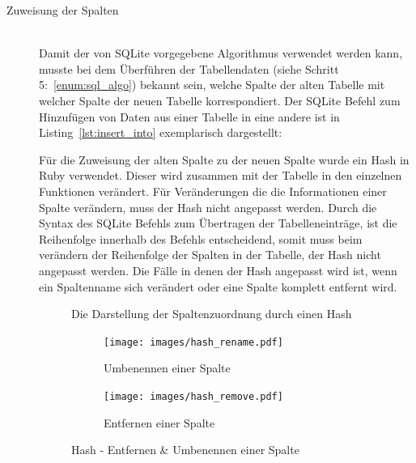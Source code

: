 \begin{description}
\item[Zuweisung der Spalten] \hfill\\
Damit der von SQLite vorgegebene Algorithmus verwendet werden kann, musste bei dem Überführen der Tabellendaten (siehe Schritt 5:~\ref{enum:sql_algo}) bekannt sein, welche Spalte der alten Tabelle mit welcher Spalte der neuen Tabelle korrespondiert.  
Der SQLite Befehl zum Hinzufügen von Daten aus einer Tabelle in eine andere ist in Listing~\ref{lst:insert_into} exemplarisch dargestellt:


Für die Zuweisung der alten Spalte zu der neuen Spalte wurde ein Hash in Ruby verwendet. Dieser wird zusammen mit der Tabelle in den einzelnen Funktionen verändert. Für Veränderungen die die Informationen einer Spalte verändern, muss der Hash nicht angepasst werden. Durch die Syntax des SQLite Befehls zum Übertragen der Tabelleneinträge, ist die Reihenfolge innerhalb des Befehls entscheidend, somit muss beim verändern der Reihenfolge der Spalten in der Tabelle, der Hash nicht angepasst werden. Die Fälle in denen der Hash angepasst wird ist, wenn ein Spaltenname sich verändert oder eine Spalte komplett entfernt wird.

\begin{figure}[ht]
        \centering
        \caption{Die Darstellung der Spaltenzuordnung durch einen Hash}
        \label{pic:hash_new}
\end{figure}

\begin{figure}[ht]
  \begin{subfigure}[b]{0.45\textwidth}
    \texttt{[image: images/hash\_rename.pdf]}
    \caption{Umbenennen einer Spalte}
    \label{fig:hash_rename}
  \end{subfigure}\hfill
  \begin{subfigure}[b]{0.45\textwidth}
    \texttt{[image: images/hash\_remove.pdf]}
    \caption{Entfernen einer Spalte}
    \label{fig:hash_remove}
  \end{subfigure}
  \caption{Hash - Entfernen \& Umbenennen einer Spalte}
  \label{fig:hash_remove_rename}
\end{figure}


\end{description}
